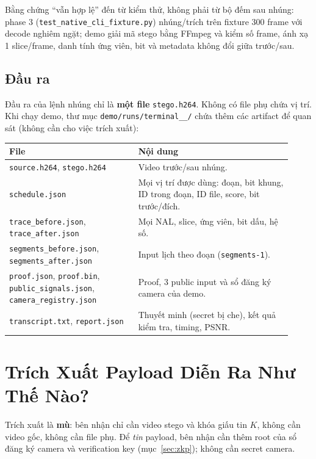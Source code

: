 \documentclass[11pt,a4paper]{article}
\begin{document}
Bằng chứng ``vẫn hợp lệ'' đến từ kiểm thử, không phải từ bộ đếm sau nhúng: phase 3
(\texttt{test\_native\_cli\_fixture.py}) nhúng/trích trên fixture 300 frame với decode
nghiêm ngặt; demo giải mã stego bằng FFmpeg và kiểm số frame, ánh xạ 1 slice/frame,
danh tính ứng viên, bit và metadata không đổi giữa trước/sau.

\subsection{Đầu ra}

Đầu ra của lệnh nhúng chỉ là \textbf{một file} \texttt{stego.h264}. Không có file phụ
chứa vị trí. Khi chạy demo, thư mục
\texttt{demo/runs/terminal\_<thời gian>\_<ngẫu nhiên>/} chứa thêm các artifact để
quan sát (không cần cho việc trích xuất):

\begin{center}
\small
\begin{tabular}{p{0.42\linewidth}p{0.50\linewidth}}
\toprule
File & Nội dung \\
\midrule
\texttt{source.h264}, \texttt{stego.h264} & Video trước/sau nhúng. \\
\texttt{schedule.json} & Mọi vị trí được dùng: đoạn, bit khung, ID trong đoạn, ID file, score, bit trước/đích. \\
\texttt{trace\_before.json}, \texttt{trace\_after.json} & Mọi NAL, slice, ứng viên, bit dấu, hệ số. \\
\texttt{segments\_before.json}, \texttt{segments\_after.json} & Input lịch theo đoạn (\texttt{segments-1}). \\
\texttt{proof.json}, \texttt{proof.bin}, \texttt{public\_signals.json}, \texttt{camera\_registry.json} & Proof, 3 public input và sổ đăng ký camera của demo. \\
\texttt{transcript.txt}, \texttt{report.json} & Thuyết minh (secret bị che), kết quả kiểm tra, timing, PSNR. \\
\bottomrule
\end{tabular}
\end{center}

\section{Trích Xuất Payload Diễn Ra Như Thế Nào?}

Trích xuất là \textbf{mù}: bên nhận chỉ cần video stego và khóa giấu tin \(K\), không
cần video gốc, không cần file phụ. Để \emph{tin} payload, bên nhận cần thêm root của sổ
đăng ký camera và verification key (mục~\ref{sec:zkp}); không cần secret camera.
\end{document}
